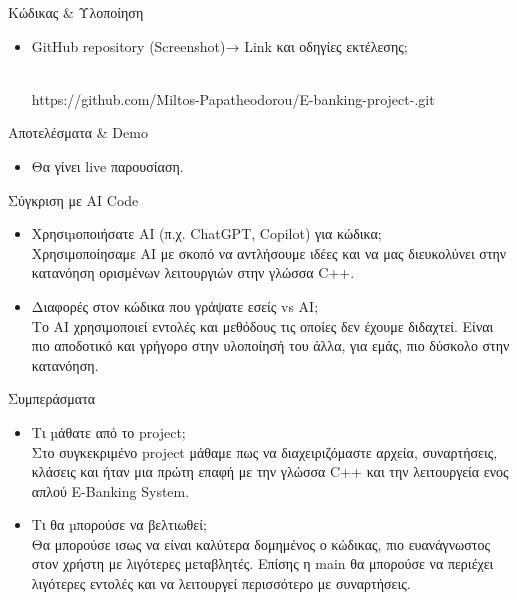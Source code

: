 \documentclass{beamer}
\begin{document}
\begin{frame}{Κώδικας \& Υλοποίηση}
\begin{itemize}
  \item GitHub repository (Screenshot)→ Link και οδηγίες εκτέλεσης;
  
  \\ https://github.com/Miltos-Papatheodorou/E-banking-project-.git
\end{itemize}
\end{frame}

\begin{frame}{Αποτελέσματα \& Demo}
\begin{itemize}
  \item Θα γίνει live παρουσίαση.
\end{itemize}
\end{frame}

\begin{frame}{Σύγκριση με AI Code}
\begin{itemize}
  \item Χρησιµοποιήσατε AI (π.χ. ChatGPT, Copilot) για κώδικα; 
  \vspace{0.2cm}
  \\Χρησιμοποίησαμε ΑΙ με σκοπό να αντλήσουμε ιδέες και να μας διευκολύνει στην κατανόηση ορισμένων λειτουργιών στην γλώσσα C++.
  \vspace{0.5cm}
  \item Διαφορές στον κώδικα που γράψατε εσείς vs AI;
  \vspace{0.2cm}
  \\ Το ΑΙ χρησιμοποιεί εντολές και μεθόδους τις οποίες δεν έχουμε διδαχτεί. Είναι πιο αποδοτικό και γρήγορο στην υλοποίησή του άλλα, για εμάς, πιο δύσκολο στην κατανόηση. 
\end{itemize}
\end{frame}

\begin{frame}{Συμπεράσματα}
\begin{itemize}
  \item Τι µάθατε από το project;
  \vspace{0.2cm}
  \\ Στο συγκεκριμένο project μάθαμε πως να διαχειριζόμαστε αρχεία, συναρτήσεις, κλάσεις και ήταν μια πρώτη επαφή με την γλώσσα C++ και την λειτουργεία ενος απλού E-Banking System.
  \vspace{0.5cm}
  \item Τι θα µπορούσε να βελτιωθεί;
  \vspace{0.2cm}
  \\ Θα μπορούσε ισως να είναι καλύτερα δομημένος ο κώδικας, πιο ευανάγνωστος στον χρήστη με λιγότερες μεταβλητές. Επίσης η main θα μπορούσε να περιέχει λιγότερες εντολές και να λειτουργεί περισσότερο με συναρτήσεις.
  
\end{itemize}
\end{frame}
\end{document}
